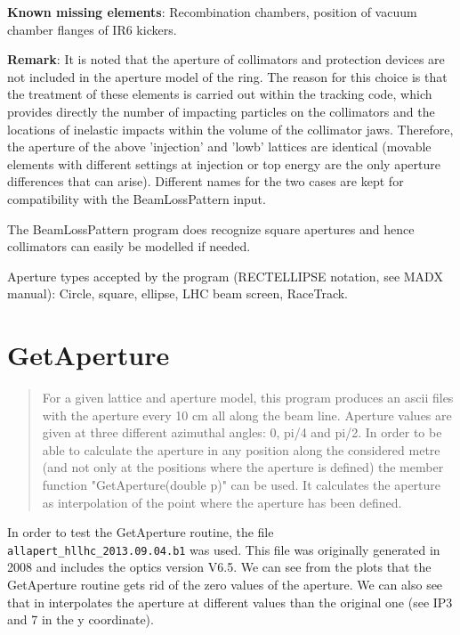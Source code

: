 \documentclass[11pt]{article}
\begin{document}
\begin{mdframed}[style=MyFrame]
{\textbf{Known missing elements}: Recombination chambers, position of vacuum chamber flanges of IR6 kickers.

\textbf{Remark}: It is noted that the aperture of collimators and protection devices are not included in the aperture model of the ring. The reason for this choice is that the treatment of these elements is carried out within the tracking code, which provides directly the number of impacting particles on the collimators and the locations of inelastic impacts within the volume of the collimator jaws. 
Therefore, the aperture of the above 'injection' and 'lowb' lattices are identical (movable elements with different settings at injection or top energy are the only aperture differences that can arise). Different names for the two cases are kept for compatibility with the BeamLossPattern input.

The BeamLossPattern program does recognize square apertures and hence collimators can easily be modelled if needed. 

Aperture types accepted by the program (RECTELLIPSE notation, see MADX manual): Circle, square, ellipse, LHC beam screen, RaceTrack.
}
\end{mdframed}

\clearpage
 
\section{GetAperture}
\begin{mdframed}[style=MyFrame]
\hyphenblockcquote{english}{website}{For a given lattice and aperture model, this program produces an ascii files with the aperture every 10 cm all along the beam line. Aperture values are given at three different azimuthal angles: 0, pi/4 and pi/2. In order to be able to calculate the aperture in any position along the considered metre (and not only at the positions where the aperture is defined) the member function "GetAperture(double p)" can be used.
It calculates the aperture as interpolation of the point where the aperture has been defined.}
\end{mdframed}

In order to test the GetAperture routine, the file \texttt{allapert\_hllhc\_2013.09.04.b1} was used. This file was originally generated in 2008 and includes the optics version V6.5. We can see from the plots that the GetAperture routine gets rid of the zero values of the aperture. We can also see that in interpolates the aperture at different values than the original one (see IP3 and 7 in the y coordinate).
\end{document}
